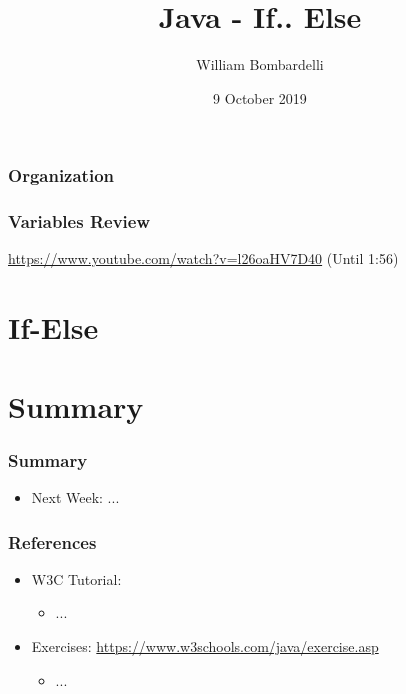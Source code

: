 \documentclass{beamer}
\title[Java]{Java - If.. Else}
\author[W. Bombardelli]{William Bombardelli}
\institute[Schweizerschule Mexiko]
{
	\vskip 12pt
	Schweizerschule Mexiko, Ciudad de México, Mexico \\
	\texttt{\url{https://github.com/wbombardellis/java-unterricht}}
}
\date{9 October 2019}
\begin{document}
	\begin{frame}
		\titlepage
	\end{frame}
	
	\begin{frame}
		\frametitle{Organization}
		\tableofcontents
	\end{frame}

	\begin{frame}
		\frametitle{Variables Review}
		\url{https://www.youtube.com/watch?v=l26oaHV7D40} (Until 1:56)
	\end{frame}

	\section{If-Else}
	
	\section{Summary}
	
	\begin{frame}
		\frametitle{Summary}
		\begin{itemize}
			\item Next Week: ...
		\end{itemize}
	\end{frame}

	\begin{frame}
		\frametitle{References}
		\begin{itemize}
			\item W3C Tutorial: 
			\begin{itemize}
				\item ...
			\end{itemize}
			\item Exercises: \url{https://www.w3schools.com/java/exercise.asp}
			\begin{itemize}
				\item ...
			\end{itemize}
		\end{itemize}
	\end{frame}
\end{document}
